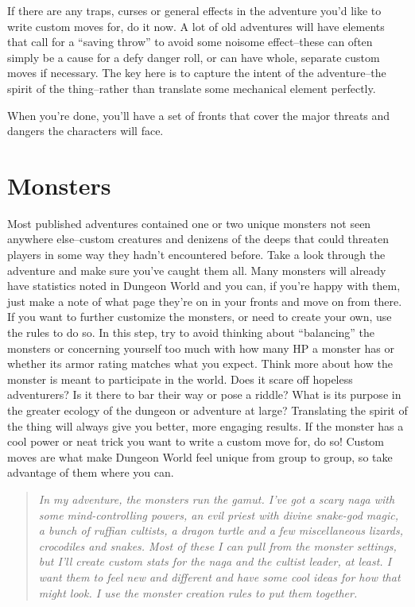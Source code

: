 If there are any traps, curses or general effects in the adventure you'd like to write custom moves for, do it now. A lot of old adventures will have elements that call for a ``saving throw'' to avoid some noisome effect--these can often simply be a cause for a defy danger roll, or can have whole, separate custom moves if necessary. The key here is to capture the intent of the adventure--the spirit of the thing--rather than translate some mechanical element perfectly.


When you're done, you'll have a set of fronts that cover the major threats and dangers the characters will face.
\section*{Monsters}


Most published adventures contained one or two unique monsters not seen anywhere else--custom creatures and denizens of the deeps that could threaten players in some way they hadn't encountered before. Take a look through the adventure and make sure you've caught them all. Many monsters will already have statistics noted in Dungeon World and you can, if you're happy with them, just make a note of what page they're on in your fronts and move on from there. If you want to further customize the monsters, or need to create your own, use the rules to do so. In this step, try to avoid thinking about ``balancing'' the monsters or concerning yourself too much with how many HP a monster has or whether its armor rating matches what you expect. Think more about how the monster is meant to participate in the world. Does it scare off hopeless adventurers? Is it there to bar their way or pose a riddle? What is its purpose in the greater ecology of the dungeon or adventure at large? Translating the spirit of the thing will always give you better, more engaging results. If the monster has a cool power or neat trick you want to write a custom move for, do so! Custom moves are what make Dungeon World feel unique from group to group, so take advantage of them where you can.

\begin{quote}
\emph{In my adventure, the monsters run the gamut. I've got a scary naga with some mind-controlling powers, an evil priest with divine snake-god magic, a bunch of ruffian cultists, a dragon turtle and a few miscellaneous lizards, crocodiles and snakes. Most of these I can pull from the monster settings, but I'll create custom stats for the naga and the cultist leader, at least. I want them to feel new and different and have some cool ideas for how that might look. I use the monster creation rules to put them together.}
\end{quote}
